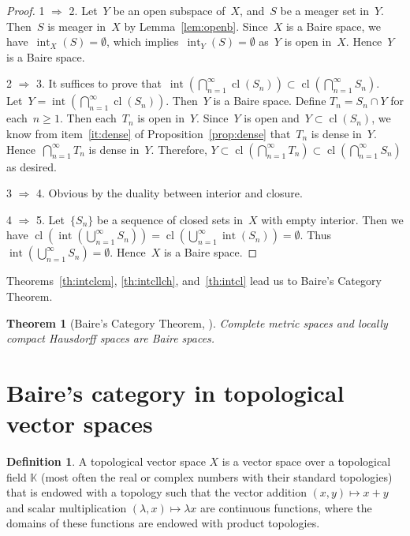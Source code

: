 \documentclass[11pt,a4paper]{article}  %
\newtheorem{theorem}{Theorem}[section]
\theoremstyle{definition}
\newtheorem{definition}{Definition}[section]
\def\KK{\mathbb{K}}
\DeclareMathOperator{\inter}{int}
\DeclareMathOperator{\cl}{cl}
\numberwithin{equation}{section}
\begin{document}
\begin{proof}
  1 $\Rightarrow$ 2. Let~$Y$ be an open subspace of~$X$, and~$S$ be a meager set in~$Y$.
  Then~$S$ is meager in~$X$ by Lemma~\ref{lem:openb}. Since~$X$ is a Baire space, we
  have~$\inter_X(S)=\emptyset$, which implies~$\inter_Y(S)=\emptyset$ as~$Y$ is open in~$X$.
  Hence~$Y$ is a Baire space.

  2 $\Rightarrow$ 3. It suffices to prove that~$\inter(\bigcap_{n=1}^\infty \cl(S_n))\subset\cl(\bigcap_{n=1}^\infty S_n)$.
  Let~$Y=\inter(\bigcap_{n=1}^\infty \cl(S_n))$. Then~$Y$ is a Baire space.
  Define $T_n = S_n\cap Y$ for each~$n\ge 1$. Then each~$T_n$ is open in~$Y$. Since~$Y$ is open
  and~$Y\subset \cl(S_n)$, we know from item~\ref{it:dense} of Proposition~\ref{prop:dense}
  that~$T_n$ is dense in~$Y$. Hence~$\bigcap_{n=1}^\infty T_n$
  is dense in~$Y$. Therefore, $Y \subset \cl(\bigcap_{n=1}^\infty T_n) \subset
  \cl(\bigcap_{n=1}^\infty S_n)$ as desired.

  3 $\Rightarrow$ 4. Obvious by the duality between interior and closure.

  4 $\Rightarrow$ 5. Let~$\{S_n\}$ be a sequence of closed sets in~$X$ with empty interior. Then we
    have
  $\cl(\inter(\bigcup_{n=1}^\infty S_n)) = \cl(\bigcup_{n=1}^\infty \inter(S_n)) = \emptyset$.
  Thus~$\inter(\bigcup_{n=1}^\infty S_n) = \emptyset$. Hence~$X$ is a Baire space.
\end{proof}

Theorems~\ref{th:intclcm}, \ref{th:intcllch}, and~\ref{th:intcl} lead us to Baire's Category
Theorem.

\begin{theorem}[Baire's Category Theorem, {\cite[Theorem~48.2]{Munkres_2000}}]
  \label{th:Baire}
  Complete metric spaces and locally compact Hausdorff spaces are Baire spaces.
\end{theorem}


\section{Baire's category in topological vector spaces}

\begin{definition}
 A topological vector space $X$ is a vector space over a topological field $\KK$ (most often the
 real or complex numbers with their standard topologies) that is endowed with a topology such that
 the vector addition $(x,y)\mapsto x+y$ and scalar multiplication $(\lambda, x) \mapsto \lambda x$ are continuous functions, where the domains of these
 functions are endowed with product topologies.
\end{definition}
\end{document}
